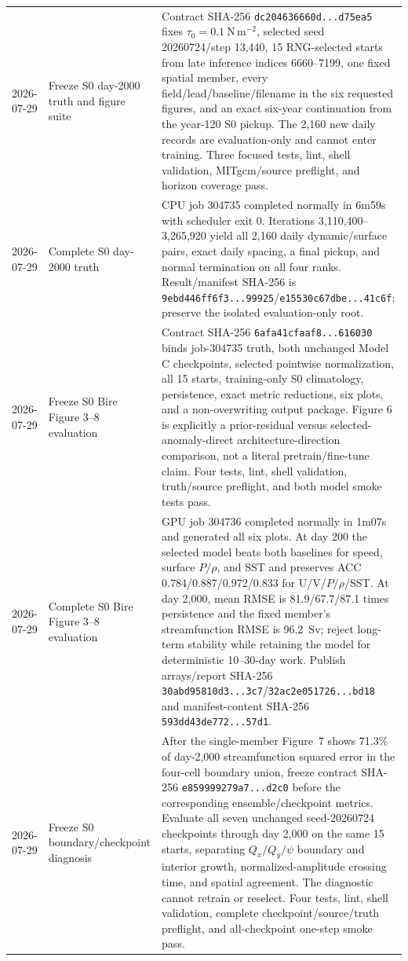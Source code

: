 \documentclass[11pt]{article}
\begin{document}
\begin{longtable}{@{}p{}p{}p{}@{}}
2026-07-29 & Freeze S0 day-2000 truth and figure suite & Contract SHA-256 \texttt{dc204636660d...d75ea5} fixes \(\tau_0=0.1~\mathrm{N\,m^{-2}}\), selected seed 20260724/step 13,440, 15 RNG-selected starts from late inference indices 6660--7199, one fixed spatial member, every field/lead/baseline/filename in the six requested figures, and an exact six-year continuation from the year-120 S0 pickup.  The 2,160 new daily records are evaluation-only and cannot enter training.  Three focused tests, lint, shell validation, MITgcm/source preflight, and horizon coverage pass. \\
2026-07-29 & Complete S0 day-2000 truth & CPU job 304735 completed normally in 6m59s with scheduler exit 0.  Iterations 3,110,400--3,265,920 yield all 2,160 daily dynamic/surface pairs, exact daily spacing, a final pickup, and normal termination on all four ranks.  Result/manifest SHA-256 is \texttt{9ebd446ff6f3...99925}/\texttt{e15530c67dbe...41c6f}; preserve the isolated evaluation-only root. \\
2026-07-29 & Freeze S0 Bire Figure 3--8 evaluation & Contract SHA-256 \texttt{6afa41cfaaf8...616030} binds job-304735 truth, both unchanged Model C checkpoints, selected pointwise normalization, all 15 starts, training-only S0 climatology, persistence, exact metric reductions, six plots, and a non-overwriting output package.  Figure 6 is explicitly a prior-residual versus selected-anomaly-direct architecture-direction comparison, not a literal pretrain/fine-tune claim.  Four tests, lint, shell validation, truth/source preflight, and both model smoke tests pass. \\
2026-07-29 & Complete S0 Bire Figure 3--8 evaluation & GPU job 304736 completed normally in 1m07s and generated all six plots.  At day 200 the selected model beats both baselines for speed, surface \(P/\rho\), and SST and preserves ACC 0.784/0.887/0.972/0.833 for U/V/\(P/\rho\)/SST.  At day 2,000, mean RMSE is 81.9/67.7/87.1 times persistence and the fixed member's streamfunction RMSE is 96.2~Sv; reject long-term stability while retaining the model for deterministic 10--30-day work.  Publish arrays/report SHA-256 \texttt{30abd95810d3...3c7}/\texttt{32ac2e051726...bd18} and manifest-content SHA-256 \texttt{593dd43de772...57d1}. \\
2026-07-29 & Freeze S0 boundary/checkpoint diagnosis & After the single-member Figure~7 shows 71.3\% of day-2,000 streamfunction squared error in the four-cell boundary union, freeze contract SHA-256 \texttt{e859999279a7...d2c0} before the corresponding ensemble/checkpoint metrics.  Evaluate all seven unchanged seed-20260724 checkpoints through day 2,000 on the same 15 starts, separating \(Q_x/Q_y/\psi\) boundary and interior growth, normalized-amplitude crossing time, and spatial agreement.  The diagnostic cannot retrain or reselect.  Four tests, lint, shell validation, complete checkpoint/source/truth preflight, and all-checkpoint one-step smoke pass. \\

\end{longtable}
\end{document}
